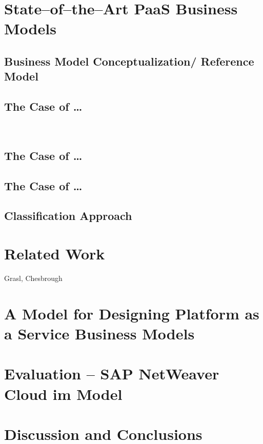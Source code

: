 	\citep{Johnson2008}

\chapter{State--of--the--Art PaaS Business Models}

	\section{Business Model Conceptualization/ Reference Model}
	
	\section{The Case of \ldots}
		\lipsum ~\\
		
	\section{The Case of \ldots}
	\section{The Case of \ldots}
	
	\section{Classification Approach}
	
	\lipsum

\chapter{Related Work}
Grasl, Chesbrough


\chapter{A Model for Designing Platform as a Service Business Models}

\chapter{Evaluation -- SAP NetWeaver Cloud im Model}

\chapter{Discussion and Conclusions}



